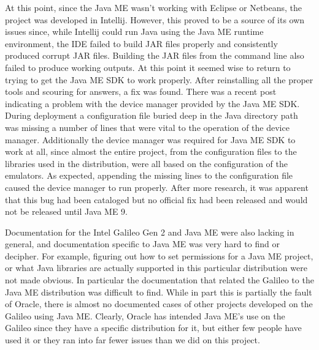 At this point, since the Java ME wasn't working with Eclipse or Netbeans, the project was developed in Intellij. However, this proved to be a source of its own issues since, while Intellij could run Java using the Java ME runtime environment, the IDE failed to build JAR files properly and consistently produced corrupt JAR files. Building the JAR files from the command line also failed to produce working outputs. At this point it seemed wise to return to trying to get the Java ME SDK to work properly. After reinstalling all the proper tools and scouring for answers, a fix was found. There was a recent post indicating a problem with the device manager provided by the Java ME SDK. During deployment a configuration file buried deep in the Java directory path was missing a number of lines that were vital to the operation of the device manager. Additionally the device manager was required for Java ME SDK to work at all, since almost the entire project, from the configuration files to the libraries used in the distribution, were all based on the configuration of the emulators. As expected, appending the missing lines to the configuration file caused the device manager to run properly. After more research, it was apparent that this bug had been cataloged but no official fix had been released and would not be released until Java ME 9.  

Documentation for the Intel Galileo Gen 2  and Java ME were also lacking in general, and documentation specific to Java ME was very hard to find or decipher. For example, figuring out how to set permissions for a Java ME project, or what Java libraries are actually supported in this particular distribution were not made obvious. In particular the documentation that related the Galileo to the Java ME distribution was difficult to find. While in part this is partially the fault of Oracle, there is almost no documented cases of other projects developed on the Galileo using Java ME. Clearly, Oracle has intended Java ME's use on the Galileo since they have a specific distribution for it, but either few people have used it or they ran into far fewer issues than we did on this project. 

